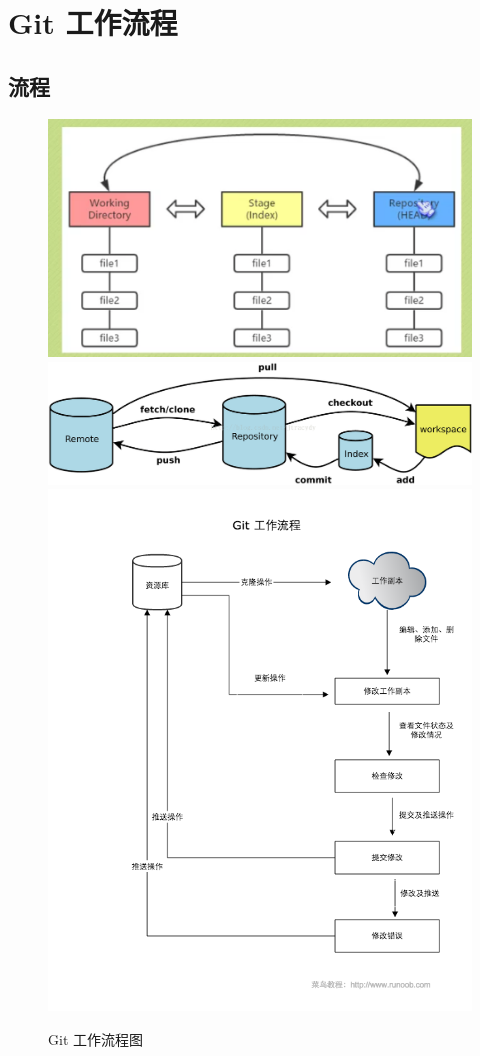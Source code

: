 \documentclass[UTF8,a4paper,12pt]{ctexbook}
\begin{document}
  \chapter{Git 工作流程}
		\section{流程}
		  \begin{figure}[ht]
		  	\centering
		  	\includegraphics[scale = 0.7]{figure/process.png}
		  	\includegraphics[scale = 0.3]{figure/gitArc.png}
		  	\includegraphics[scale = 0.5]{git-process.png}
		  	\caption{Git 工作流程图}
		  \end{figure}
		  
\end{document}
